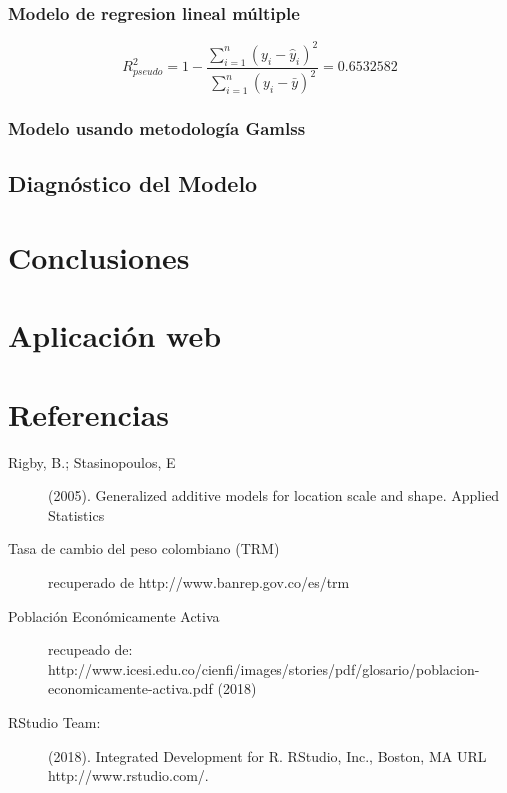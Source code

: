 \documentclass[11pt,twoside]{article}
\begin{document}
	\subsubsection{Modelo de regresion lineal múltiple}
\begin{equation}
	{ R }^{ 2 }_{pseudo}=1-\frac { \sum _{ i=1 }^{ n }{ { ({ y }_{ i }-{ \hat { y }  }_{ i }) }^{ 2 } }  }{ \sum _{ i=1 }^{ n }{ { ({ y }_{ i }-{ \bar { y }  }) }^{ 2 } }  }  = 0.6532582
	\end{equation}
	
	\subsubsection{Modelo usando metodología Gamlss}
	\subsection{Diagnóstico del Modelo}
	\section{Conclusiones}
	
	
	\section{Aplicación web}
	\section{Referencias}
	\begin{description}
		
		
		\item[Rigby, B.; Stasinopoulos, E] (2005).
		Generalized additive
		models for location scale and shape. Applied Statistics
		
		\item[Tasa de cambio del peso colombiano (TRM)]  recuperado de http://www.banrep.gov.co/es/trm
		
		
		\item[Población Económicamente Activa]
		recupeado de:\\
		http://www.icesi.edu.co/cienfi/images/stories/pdf/glosario/poblacion-economicamente-activa.pdf (2018)
		
		
		\item[RStudio Team:] (2018).
		Integrated Development for R. RStudio, Inc., Boston, MA URL http://www.rstudio.com/.  
		
		
	\end{description}
	
\end{document}
